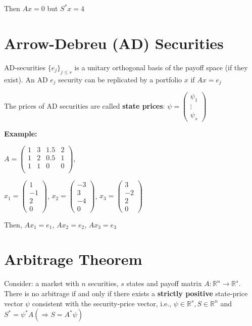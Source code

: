 Then $Ax = 0$ but $S^* x = 4$

\section{Arrow-Debreu (AD) Securities}

AD-securities $\{e_j\}_{j\leq s}$ is a unitary orthogonal basis of the payoff space (if they exist). An AD $e_j$ security can be replicated by a portfolio $x$ if $Ax = e_j$

The prices of AD securities are called \textbf{state prices}: $\psi = \begin{pmatrix}  \psi_1 \\ \vdots \\ \psi_s \end{pmatrix}$


\textbf{Example:}

$A = \begin{pmatrix} 1 & 3 & 1.5 & 2\\ 1 & 2 & 0.5 & 1 \\ 1 & 1 & 0 & 0 \\\end{pmatrix}$, 

$x_1 = \begin{pmatrix}  1 \\ -1 \\ 2 \\ 0\end{pmatrix}$, $x_2 = \begin{pmatrix}  -3 \\ 3 \\ -4 \\ 0\end{pmatrix}$, $x_3 = \begin{pmatrix} 3  \\ -2 \\ 2 \\ 0\end{pmatrix}$

Then, $A x_1 = e_1$, $A x_2 = e_2$, $A x_3 = e_3$


\section{Arbitrage Theorem}

Consider: a market with $n$ securities, $s$ states and payoff matrix $A: \mathbb{R}^n \to \mathbb{R}^s$. There is no arbitrage if and only if there exists a \textbf{strictly positive} state-price vector $\psi$ consistent with the security-price vector, i.e., $\psi \in \mathbb{R}^s, S \in \mathbb{R}^n$ and $ S^* = \psi^* A (\Rightarrow S = A^* \psi)$

